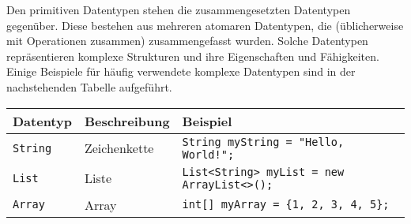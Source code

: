 \begin{Infobox}

Den primitiven Datentypen stehen die zusammengesetzten Datentypen gegenüber.
Diese bestehen aus mehreren atomaren Datentypen, die (üblicherweise mit Operationen zusammen) zusammengefasst wurden.
Solche Datentypen repräsentieren komplexe Strukturen und ihre Eigenschaften und Fähigkeiten.
Einige Beispiele für häufig verwendete komplexe Datentypen sind in der nachstehenden Tabelle aufgeführt.

\begin{center}
  \begin{tabular}{|l|l|l|}
    \hline
    \textbf{Datentyp} & \textbf{Beschreibung} & \textbf{Beispiel} \\
    \hline
    \texttt{String} & Zeichenkette & \lstinline|String myString = "Hello, World!";| \\
    \hline
    \texttt{List} & Liste & \lstinline|List<String> myList = new ArrayList<>();| \\
    \hline
    \texttt{Array} & Array & \lstinline|int[] myArray = {1, 2, 3, 4, 5};| \\
    \hline
  \end{tabular}
\end{center}

\end{Infobox}
\addexcercise



